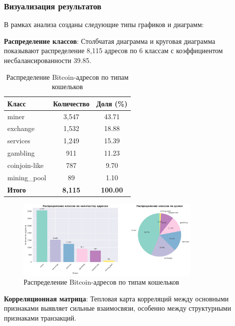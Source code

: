 \subsubsection{Визуализация результатов}

В рамках анализа созданы следующие типы графиков и диаграмм:

\textbf{Распределение классов}: Столбчатая диаграмма и круговая диаграмма показывают распределение 8,115 адресов по 6 классам с коэффициентом несбалансированности 39.85.

\begin{table}[H]
\centering
\caption{Распределение Bitcoin-адресов по типам кошельков}
\label{tab:class_distribution}
\begin{tabular}{|l|c|c|}
\hline
\textbf{Класс} & \textbf{Количество} & \textbf{Доля (\%)} \\
\hline
miner & 3,547 & 43.71 \\
exchange & 1,532 & 18.88 \\
services & 1,249 & 15.39 \\
gambling & 911 & 11.23 \\
coinjoin-like & 787 & 9.70 \\
mining\_pool & 89 & 1.10 \\
\hline
\textbf{Итого} & \textbf{8,115} & \textbf{100.00} \\
\hline
\end{tabular}
\end{table}

\begin{figure}[H]
\centering
\includegraphics[width=0.8\textwidth]{bitcoin_data_collector/images/class_distribution.jpg}
\caption{Распределение Bitcoin-адресов по типам кошельков}
\label{fig:class_distribution}
\end{figure}

\textbf{Корреляционная матрица}: Тепловая карта корреляций между основными признаками выявляет сильные взаимосвязи, особенно между структурными признаками транзакций.

